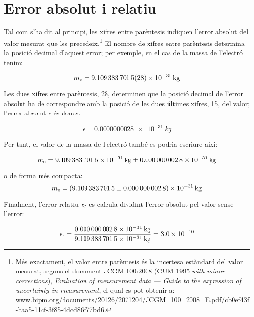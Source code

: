  
  
 
   
  
  
  
  
  
 \index{$\sigma$}  


\section{Error absolut i relatiu}\label{sec:err_abs_rel}

Tal com s'ha dit al principi, les xifres entre parèntesis indiquen l'error absolut del valor mesurat que les precedeix.\footnote{Més exactament, el valor entre parèntesis és la incertesa estàndard del valor mesurat, segons el document JCGM 100:2008 (GUM 1995 \textit{with minor
corrections}), \textit{Evaluation of measurement data --- Guide to the expression of uncertainty in
measurement}, el qual es pot obtenir a:  \href{https://www.bipm.org/documents/20126/2071204/JCGM\_100\_2008\_E.pdf/cb0ef43f-baa5-11cf-3f85-4dcd86f77bd6}{www.bipm.org/documents/20126/2071204/JCGM\_100\_2008\_E.pdf/cb0ef43f-baa5-11cf-3f85-4dcd86f77bd6}.} El nombre de xifres entre parèntesis determina la posició decimal d'aquest error; per exemple, en el cas de la  massa de l'electró tenim:

\[
    m_\mathrm{e} = \qty{9,109 383 7015(28) e-31}{kg}
\]

Les dues xifres entre parèntesis, 28, determinen que la posició decimal de l'error absolut ha de correspondre amb la posició de les dues últimes xifres, 15, del valor; l'error absolut $\epsilon$  és doncs:

\[
    \epsilon = \qty{0,000 000 0028 e-31}{kg}
\]

Per tant, el valor de la massa de l'electró també es podria escriure així:

 \[
    m\ped{e} = \qty[separate-uncertainty,separate-uncertainty-units = repeat]{9,109 383 7015(28) e-31}{kg}
\]

o de forma més compacta:
\[
m\ped{e} = \qty[separate-uncertainty,separate-uncertainty-units = bracket]{9,109 383 7015(28) e-31}{kg}
\]

Finalment, l'error relatiu $\epsilon_\mathrm{r}$ es calcula dividint l'error absolut pel valor sense l'error:

\[
    \epsilon_\mathrm{r} = \frac{\qty{0,000 000 0028 e-31}{kg}}{\qty{9,109 383 7015 e-31}{kg}} =   \num{3,0e-10}
\]
